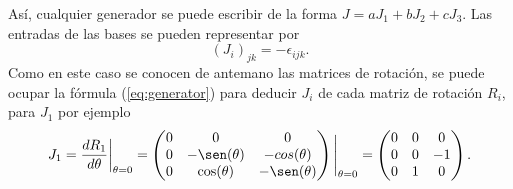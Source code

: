Así, cualquier generador se puede escribir de la forma $J = aJ_1+ bJ_2+cJ_3$. Las entradas de las bases se pueden representar por
\begin{equation}
  (J_i)_{jk} = -\epsilon_{ijk}.
\end{equation}
Como en este caso se conocen de antemano las matrices de rotación, se puede ocupar la fórmula (\ref{eq:generator}) para deducir $J_i$ de cada matriz de rotación $R_i$, para $J_1$ por ejemplo
\begin{equation}
  J_1 = \frac{dR_1}{d\theta}\bigg|_{\theta=0} = \begin{pmatrix}
    0 & 0 & 0 \\ 0 & -\sen(\theta) & -cos(\theta)\\ 0 & \cos(\theta) & -\sen(\theta)
  \end{pmatrix} \Bigg|_{\theta=0} = \begin{pmatrix}
    0 & 0 & 0 \\ 0&0&-1\\ 0&1&0
  \end{pmatrix}.
\end{equation}
